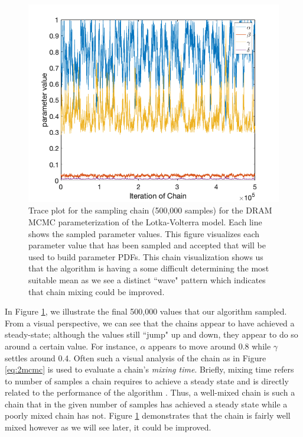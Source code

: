 \begin{figure}[H]
    \centering
    \includegraphics[width=15cm]{MCMC_figs/met_lv_final/final_mh_chain.png}
    \caption{Trace plot for the sampling chain (500,000 samples) for the DRAM MCMC parameterization of the Lotka-Volterra model. Each line shows the sampled parameter values. This figure visualizes each parameter value that has been sampled and accepted that will be used to build parameter PDFs. This chain visualization shows us that the algorithm is having a some difficult determining the most suitable mean as we see a distinct ``wave" pattern which indicates that chain mixing could be improved.}
    \label{fig:2mcmc}
\end{figure}
 In Figure \ref{fig:2mcmc}, we illustrate the final 500,000 values that our algorithm sampled. From a visual perspective, we can see that the chains appear to have achieved a steady-state; although the values still ``jump" up and down, they appear to do so around a certain value. For instance, $\alpha$ appears to move around 0.8 while $\gamma$ settles around 0.4. Often such a visual analysis of the chain as in Figure \ref{eq:2mcmc} is used to evaluate a chain's \textit{mixing time}. Briefly, mixing time refers to number of samples a chain requires to achieve a steady state and is directly related to the performance of the algorithm \cite{mixingtime}. Thus, a well-mixed chain is such a chain that in the given number of samples has achieved a steady state while a poorly mixed chain has not. Figure \ref{fig:2mcmc} demonstrates that the chain is fairly well mixed however as we will see later, it could be improved.
